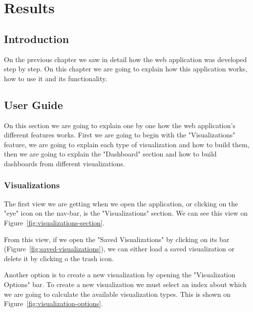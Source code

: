 \documentclass[a4paper, 12pt, english]{book}
\begin{document}



\cleardoublepage
\chapter{Results}
\section{Introduction}
\label{sec:results-introduction}
On the previous chapter we saw in detail how the web application was developed step by step. On this chapter we are going to explain how this application works, how to use it and its functionality.

\section{User Guide}
\label{sec:results-user-guide}
On this section we are going to explain one by one how the web application's different features works. First we are going to begin with the "Visualizations" feature, we are going to explain each type of visualization and how to build them, then we are going to explain the "Dashboard" section and how to build dashboards from different visualizations.

\subsection{Visualizations}
\label{sec:results-visualizations}
The first view we are getting when we open the application, or clicking on the "eye" icon on the nav-bar, is the "Visualizations" section. We can see this view on Figure~\ref{fig:visualizations-section}.

From this view, if we open the "Saved Visualizations" by clicking on its bar (Figure~\ref{fig:saved-visualizations}),  we can either load a saved visualization or delete it by clicking o the trash icon.

Another option is to create a new visualization by opening the "Visualization Options" bar. To create a new visualization we must select an index about which we are going to calculate the available visualization types. This is shown on Figure~\ref{fig:visualization-options}.
\end{document}
